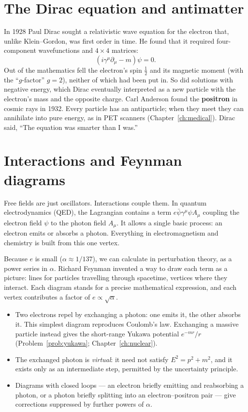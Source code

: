 \section{The Dirac equation and antimatter}

In 1928 Paul Dirac sought a relativistic wave equation for the electron that, unlike Klein--Gordon, was first order in time. He found that it required four-component wavefunctions and $4\times4$ matrices:
\[
  (i\gamma^\mu\partial_\mu - m)\psi = 0 .
\]
Out of the mathematics fell the electron's spin $\tfrac12$ and its magnetic moment (with the ``$g$-factor'' $g = 2$), neither of which had been put in. So did solutions with negative energy, which Dirac eventually interpreted as a new particle with the electron's mass and the opposite charge. Carl Anderson found the \textbf{positron} in cosmic rays in 1932. Every particle has an antiparticle; when they meet they can annihilate into pure energy, as in PET scanners (Chapter~\ref{ch:medical}). Dirac said, ``The equation was smarter than I was.''

\section{Interactions and Feynman diagrams}

Free fields are just oscillators. Interactions couple them. In quantum electrodynamics (QED), the Lagrangian contains a term $e\bar\psi\gamma^\mu\psi A_\mu$ coupling the electron field $\psi$ to the photon field $A_\mu$. It allows a single basic process: an electron emits or absorbs a photon. Everything in electromagnetism and chemistry is built from this one vertex.

Because $e$ is small ($\alpha\approx1/137$), we can calculate in perturbation theory, as a power series in $\alpha$. Richard Feynman invented a way to draw each term as a picture: lines for particles travelling through spacetime, vertices where they interact. Each diagram stands for a precise mathematical expression, and each vertex contributes a factor of $e\propto\sqrt\alpha$.
\begin{itemize}[itemsep=3pt]
  \item Two electrons repel by exchanging a photon: one emits it, the other absorbs it. This simplest diagram reproduces Coulomb's law. Exchanging a massive particle instead gives the short-range Yukawa potential $e^{-mr}/r$ (Problem~\ref{prob:yukawa}; Chapter~\ref{ch:nuclear}).
  \item The exchanged photon is \emph{virtual}: it need not satisfy $E^2 = p^2 + m^2$, and it exists only as an intermediate step, permitted by the uncertainty principle.
  \item Diagrams with closed loops --- an electron briefly emitting and reabsorbing a photon, or a photon briefly splitting into an electron--positron pair --- give corrections suppressed by further powers of $\alpha$.
\end{itemize}

